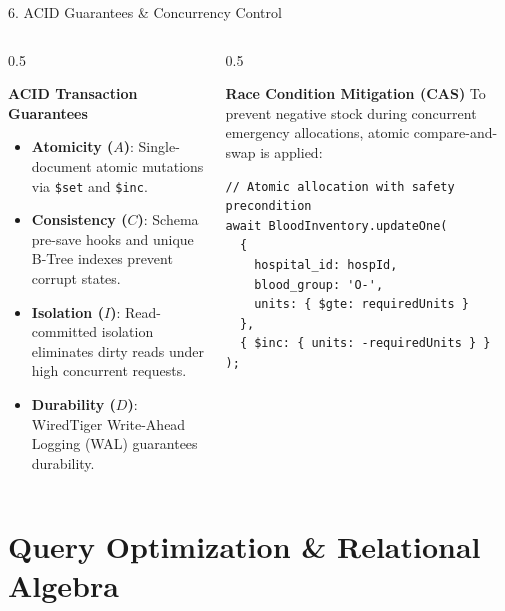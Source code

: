 \documentclass[aspectratio=169,10pt]{beamer}
\begin{document}
\begin{frame}[fragile]{6. ACID Guarantees \& Concurrency Control}
    \begin{columns}[T]
        \begin{column}{0.5\textwidth}
            \begin{block}{\textbf{ACID Transaction Guarantees}}
                \begin{itemize}
                    \item \textbf{Atomicity ($A$)}: Single-document atomic mutations via \texttt{\$set} and \texttt{\$inc}.
                    \item \textbf{Consistency ($C$)}: Schema pre-save hooks and unique B-Tree indexes prevent corrupt states.
                    \item \textbf{Isolation ($I$)}: Read-committed isolation eliminates dirty reads under high concurrent requests.
                    \item \textbf{Durability ($D$)}: WiredTiger Write-Ahead Logging (WAL) guarantees durability.
                \end{itemize}
            \end{block}
        \end{column}
        \begin{column}{0.5\textwidth}
            \begin{alertblock}{\textbf{Race Condition Mitigation (CAS)}}
                \scriptsize
                To prevent negative stock during concurrent emergency allocations, atomic compare-and-swap is applied:
\begin{lstlisting}
// Atomic allocation with safety precondition
await BloodInventory.updateOne(
  { 
    hospital_id: hospId, 
    blood_group: 'O-', 
    units: { $gte: requiredUnits } 
  },
  { $inc: { units: -requiredUnits } }
);
\end{lstlisting}
            \end{alertblock}
        \end{column}
    \end{columns}
\end{frame}

\section{Query Optimization \& Relational Algebra}
\end{document}
